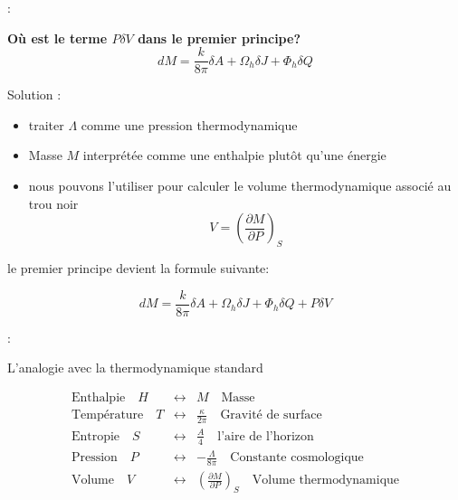 \begin{frame}{\underline{\secname} : {\small \subsecname}}
\begin{center}
	\textbf{Où est le terme $P \delta V$ dans le premier principe?}
		$$dM=\dfrac{k}{8\pi}\delta A+\Omega_{h}\delta J+\Phi_{h}\delta Q$$
\end{center}
\pause
Solution : 
\begin{itemize}		 \setlength\itemsep{0.5em}
	\item traiter $\Lambda$ comme une pression thermodynamique \item
Masse $M$ interprétée comme une enthalpie plutôt qu'une énergie \item
nous pouvons l'utiliser pour calculer le volume thermodynamique associé au trou noir $$V= \left(\frac{\partial M}{\partial P} \right)_S$$
\end{itemize}
\pause 
le premier principe devient la formule suivante:
\begin{center}
	$$dM=\dfrac{k}{8\pi}\delta A+\Omega_{h}\delta J+\Phi_{h}\delta Q +P \delta V$$
 
\end{center}


\end{frame}




\begin{frame}{\underline{\secname} : {\small \subsecname}}
\begin{block}{ L’analogie avec la thermodynamique standard }
		
	\begin{eqnarray*}
	\textrm{Enthalpie}\quad  H &\leftrightarrow&  M\quad  \textrm{Masse}   \nonumber\\
	\textrm{Température}\quad  T &\leftrightarrow&  \frac{\kappa}{2\pi} \quad  \textrm{Gravité de surface}   \nonumber\\
	\textrm{Entropie}\quad  S &\leftrightarrow&  \frac{A}{4 } \quad  \textrm{l'aire de l'horizon}   \nonumber\\
	\textrm{Pression}\quad  P &\leftrightarrow&  -\frac{\Lambda}{8\pi} \quad  \textrm{Constante cosmologique}   \nonumber\\
	\textrm{Volume}\quad  V &\leftrightarrow&  \left(\frac{\partial M}{\partial P} \right)_S \quad  \textrm{Volume thermodynamique}   \nonumber\\
	\end{eqnarray*}

	
\end{block}
\end{frame}

